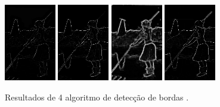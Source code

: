 \begin{figure}[!htb]
 \centering
 \def\baselinestretch{1}\small\normalsize
 \includegraphics[width=0.2\textwidth]{img/101087-77.jpg}\qquad
 \includegraphics[width=0.2\textwidth]{img/101087-80.jpg}  \qquad 
  \includegraphics[width=0.2\textwidth]{img/101087-82.jpg}  \qquad
 \includegraphics[width=0.2\textwidth]{img/101087-85.jpg}        
 \caption{\label{fig:indiosegmentado}Resultados de 4 algoritmo de detec\c{c}\~{a}o de bordas \citep{berkeley}.}
\end{figure}



